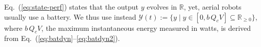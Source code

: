 \documentclass[letterpaper,10pt,journal,twoside]{IEEEtran}
\theoremstyle{definition}
\newtheorem{defn}{Definition}[section]
\begin{document}

Eq.~(\ref{eq:state-perf}) states that the output $y$ evolves in $\mathbb{R}$, %
yet, aerial robots usually use a battery.
We thus use instead
  $\mathcal{Y}(t):=\{y\mid y\in[0,b\,Q_cV]\subseteq{\mathbb{R}_{\geq 0}}\}$, 
where $b\,Q_cV$, the maximum instantaneous energy %
measured in watts, is derived from Eq.~(\ref{eq:batdyn}--\ref{eq:batdyn2}).



\end{document}
